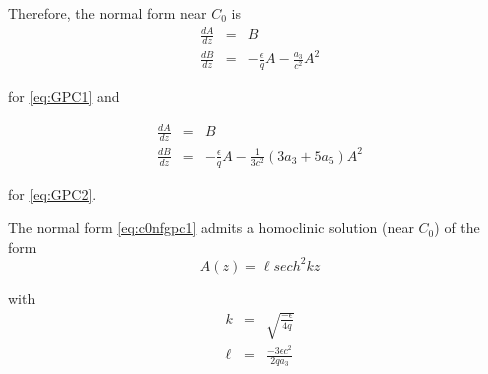 Therefore, the normal form near $C_0$ is
\begin{subequations}\label{eq:c0nfgpc1}
\begin{eqnarray}
\frac{dA}{dz} &=& B \\
\frac{dB}{dz} &=& -\frac{\epsilon}{q} A - \frac{a_3}{ c^2} A^2
\end{eqnarray}
\end{subequations}

for \eqref{eq:GPC1} and

\begin{subequations}\label{eq:c0nfgpc2}
\begin{eqnarray}
\frac{dA}{dz} &=& B \\
\frac{dB}{dz} &=& -\frac{\epsilon}{q} A - \frac{1}{3 c^2} \left(3 a_3 + 5 a_5 \right) A^2
\end{eqnarray}
\end{subequations}

for \eqref{eq:GPC2}.

The normal form \eqref{eq:c0nfgpc1} admits a homoclinic solution (near $C_0$) of the form 
\begin{equation}
A\left(z\right) = \ell  sech^2{k z}
\end{equation}

with 
\begin{subequations} 
\begin{eqnarray}
k &=& \sqrt{\frac{-\epsilon}{4q}}  \\
\ell &=& \frac{ - 3 \epsilon c^2 }{2 q a_3 } 
\end{eqnarray}
\end{subequations}

